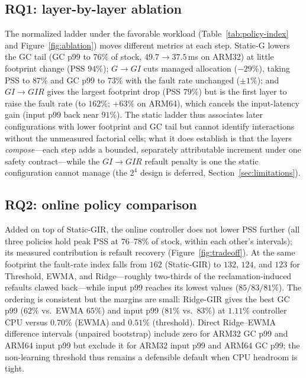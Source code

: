 \subsection{RQ1: layer-by-layer ablation}
\label{sec:rq1}

The normalized ladder under the favorable workload (Table~\ref{tab:policy-index}
and Figure~\ref{fig:ablation}) moves different metrics at each step. \textsf{Static-G} lowers the GC tail (GC p99
to $76\%$ of stock, $49.7\to37.5$\,ms on ARM32) at little footprint change (PSS
$94\%$); $G{\to}GI$ cuts managed allocation ($-29\%$), taking PSS to $87\%$ and GC
p99 to $73\%$ with the fault rate unchanged ($\pm1\%$); and $GI{\to}GIR$ gives the
largest footprint drop (PSS $79\%$) but is the first layer to raise the fault rate
(to $162\%$; $+63\%$ on ARM64), which cancels the input-latency gain (input p99
back near $91\%$). The static ladder thus associates later configurations with
lower footprint and GC tail but cannot identify interactions without the
unmeasured factorial cells; what it does establish is that the layers
\emph{compose}---each step adds a bounded, separately attributable increment under
one safety contract---while the $GI{\to}GIR$ refault penalty is one the static
configuration cannot manage (the $2^4$ design is deferred, Section~\ref{sec:limitations}).

\subsection{RQ2: online policy comparison}
\label{sec:rq2}
Added on top of \textsf{Static-GIR}, the online controller does not lower PSS
further (all three policies hold peak PSS at $76$--$78\%$ of stock, within each
other's intervals); its measured contribution is refault recovery
(Figure~\ref{fig:tradeoff}). At the same
footprint the fault-rate index falls from $162$ (\textsf{Static-GIR}) to $132$,
$124$, and $123$ for Threshold, EWMA, and Ridge---roughly two-thirds of the
reclamation-induced refaults clawed back---while input p99 reaches its lowest
values ($85/83/81\%$). The ordering is consistent but the margins are small:
\textsf{Ridge-GIR} gives the best GC p99 ($62\%$ vs.\ EWMA $65\%$) and input p99
($81\%$ vs.\ $83\%$) at $1.11\%$ controller CPU versus $0.70\%$ (EWMA) and
$0.51\%$ (threshold). Direct Ridge--EWMA difference intervals (unpaired bootstrap)
include zero for ARM32 GC p99 and ARM64 input p99 but exclude it for ARM32 input
p99 and ARM64 GC p99; the non-learning threshold thus remains a defensible default
when CPU headroom is tight.

